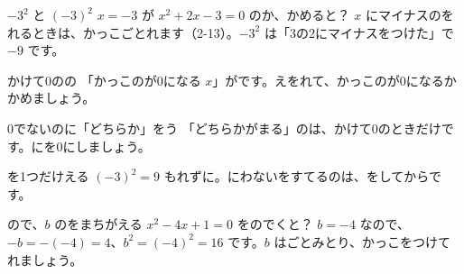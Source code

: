 \begin{tsumazuki}{$-3^2$ と $(-3)^2$}
$x=-3$ が $x^2+2x-3=0$ のか、かめると？
$x$ にマイナスのをれるときは、かっこごとれます（2-13）。$-3^2$ は「3の2にマイナスをつけた」で $-9$ です。
\end{tsumazuki}

\begin{tsumazuki}{かけて0のの}
「かっこのが0になる $x$」がです。えをれて、かっこのが0になるかかめましょう。
\end{tsumazuki}

\begin{tsumazuki}{0でないのに「どちらか」をう}
「どちらかがまる」のは、かけて0のときだけです。にを0にしましょう。
\end{tsumazuki}

\begin{tsumazuki}{を1つだけえる}
$(-3)^2=9$ もれずに。にわないをすてるのは、をしてからです。
\end{tsumazuki}

\begin{tsumazuki}{ので、$b$ のをまちがえる}
$x^2-4x+1=0$ をのでくと？
$b=-4$ なので、$-b=-(-4)=4$、$b^2=(-4)^2=16$ です。$b$ はごとみとり、かっこをつけてれましょう。
\end{tsumazuki}

